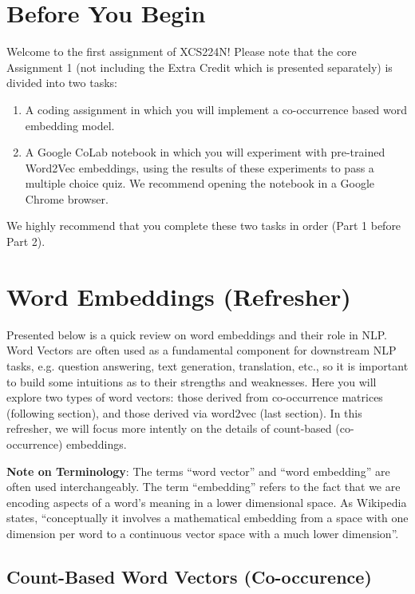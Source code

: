 \section*{Before You Begin}
Welcome to the first assignment of XCS224N! Please note that the core Assignment 1 (not including the Extra Credit which is presented separately) is divided into two tasks:
\begin{enumerate}
    \item A coding assignment in which you will implement a co-occurrence based word embedding model.
    \item A Google CoLab notebook in which you will experiment with pre-trained Word2Vec embeddings, using the results of these experiments to pass a multiple choice quiz. We recommend opening the notebook in a Google Chrome browser.
\end{enumerate}
We highly recommend that you complete these two tasks in order (Part 1 before Part 2). 
\newline

\section*{Word Embeddings (Refresher)}
Presented below is a quick review on word embeddings and their role in NLP. Word Vectors are often used as a fundamental component for downstream NLP tasks, e.g. question answering, text generation, translation, etc., so it is important to build some intuitions as to their strengths and weaknesses. Here you will explore two types of word vectors: those derived from co-occurrence matrices (following section), and those derived via word2vec (last section). In this refresher, we will focus more intently on the details of count-based (co-occurrence) embeddings. \newline

\textbf{Note on Terminology}: The terms ``word vector'' and ``word embedding'' are often used interchangeably. The term ``embedding'' refers to the fact that we are encoding aspects of a word's meaning in a lower dimensional space. As Wikipedia states, ``conceptually it involves a mathematical embedding from a space with one dimension per word to a continuous vector space with a much lower dimension''.

\subsection{Count-Based Word Vectors (Co-occurence)}

